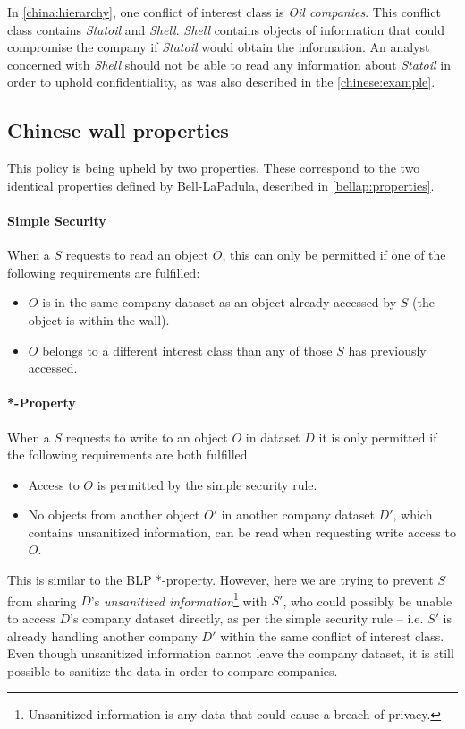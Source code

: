 In \cref{china:hierarchy}, one conflict of interest class is \emph{Oil companies}.
This conflict class contains \emph{Statoil} and \emph{Shell}. 
\emph{Shell} contains objects of information that could compromise the company if \emph{Statoil} would obtain the information.
An analyst concerned with \emph{Shell} should not be able to read any information about \emph{Statoil} in order to uphold confidentiality, as was also described in the \cref{chinese:example}.

\subsection{Chinese wall properties}
This policy is being upheld by two properties.
These correspond to the two identical properties defined by Bell-LaPadula, described in \cref{bellap:properties}.

\paragraph{Simple Security}

When a \principal{} $S$ requests to read an object $O$, this can only be permitted if one of the following requirements are fulfilled:

\begin{itemize}
\item $O$ is in the same company dataset as an object already accessed by $S$ (the object is within the wall).
\item $O$ belongs to a different interest class than any of those $S$ has previously accessed.
\end{itemize}

\paragraph{*-Property}

When a \principal{} $S$ requests to write to an object $O$ in dataset $D$ it is only permitted if the following requirements are both fulfilled.

\begin{itemize}
\item Access to $O$ is permitted by the simple security rule.
\item No objects from another object $O'$ in another company dataset $D'$, which contains unsanitized information, can be read when requesting write access to $O$.
\end{itemize}

This is similar to the BLP *-property.
However, here we are trying to prevent \principal{} $S$ from sharing $D$'s \textit{unsanitized information}\footnote{Unsanitized information is any data that could cause a breach of privacy.} with \principal{} $S'$, who could possibly be unable to access $D$'s company dataset directly, as per the simple security rule -- i.e. $S'$ is already handling another company $D'$ within the same conflict of interest class.
Even though unsanitized information cannot leave the company dataset, it is still possible to sanitize the data in order to compare companies.
